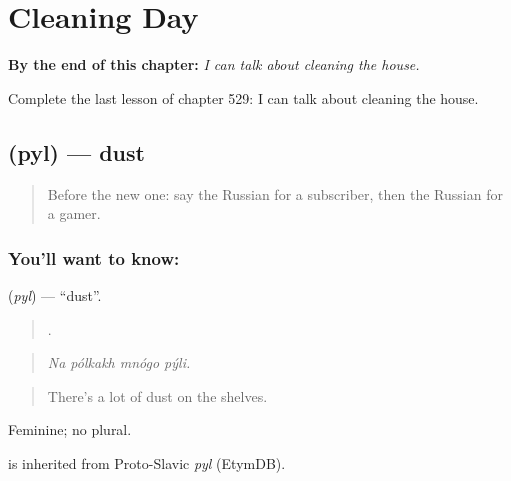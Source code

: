 
\chapter{Cleaning Day}
\label{ch:ru-cleaning-day}

\begin{chapteropening}
\textbf{By the end of this chapter:} \emph{I can talk about cleaning the house.}

Complete the last lesson of chapter 529: I can talk about cleaning the house.
\end{chapteropening}

\section[\texorpdfstring{\ru{пыль} (pyl)}{пыль (pyl)}]{ (pyl) — dust}

\label{lesson:RU-C529-pyl}



\begin{quote}
Before the new one: say the Russian for a subscriber, then the Russian for a gamer.
\end{quote}

\subsection*{You'll want to know: }
\textbf{} (\emph{pyl}) — \textquotedblleft{}dust\textquotedblright{}.

\begin{quote}
   .
\end{quote}

\begin{quote}
\emph{Na pólkakh mnógo pýli.}
\end{quote}

\begin{quote}
There's a lot of dust on the shelves.
\end{quote}

Feminine; no plural.

\begin{cousinweb}
\emph{} is inherited from Proto-Slavic \emph{pyl} (EtymDB).
\end{cousinweb}

